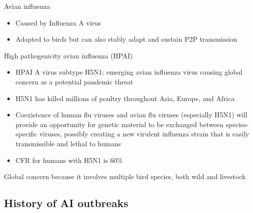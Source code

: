 \documentclass[aspectratio=43]{beamer}
\begin{document}
\begin{frame}{Avian influenza}
\begin{minipage}{0.4\textwidth}
  \end{minipage}
  \begin{minipage}{0.55\textwidth}
    \begin{itemize}
      \item Caused by Influenza A virus
      \vskip1cm
      \item Adapted to birds but can also stably adapt and sustain P2P transmission
    \end{itemize}
  \end{minipage}
\end{frame}

\begin{frame}{High pathogenicity avian influenza (HPAI)}
  \begin{itemize}
    \item HPAI A virus subtype H5N1: emerging avian influenza virus causing global concern as a potential pandemic threat
    \vfill
    \item H5N1 has killed millions of poultry throughout Asia, Europe, and Africa
    \vfill
    \item Coexistence of human flu viruses and avian flu viruses (especially H5N1) will provide an opportunity for genetic material to be exchanged between species-specific viruses, possibly creating a new virulent influenza strain that is easily transmissible and lethal to humans
    \vfill
    \item CFR for humans with H5N1 is 60\%
  \end{itemize}
\end{frame}

\begin{frame}
  Global concern because it involves multiple bird species, both wild and livestock
\end{frame}

\subsection{History of AI outbreaks}





\end{document}

